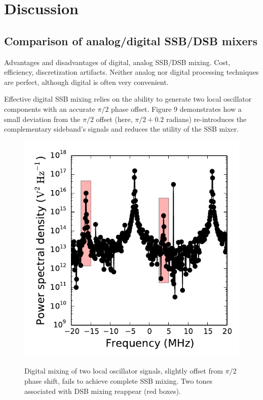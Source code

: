 \documentclass[11pt]{article}
\begin{document}
\section{Discussion}

\subsection{Comparison of analog/digital SSB/DSB mixers}

Advantages and disadvantages of digital, analog SSB/DSB mixing.  Cost,
efficiency, discretization artifacts.  Neither analog nor digital processing
techniques are perfect, although digital is often very convenient.

Effective digital SSB mixing relies on the ability to generate two local
oscillator components with an accurate $\pi/2$ phase offset.  Figure 9
demonstrates how a small deviation from the $\pi/2$ offset (here, $\pi/2 + 0.2$
radians) re-introduces the complementary sideband's signals and reduces the
utility of the SSB mixer.

\begin{figure}[!htb]
    \centering
    \includegraphics[scale=0.7]{scripts/digital_mixing_SSB_offset.pdf} \\
    \caption{Digital mixing of two local oscillator signals, slightly offset
    from $\pi/2$ phase shift, fails to achieve complete SSB mixing.  Two tones
    associated with DSB mixing reappear (red boxes).}
\end{figure}
\end{document}
